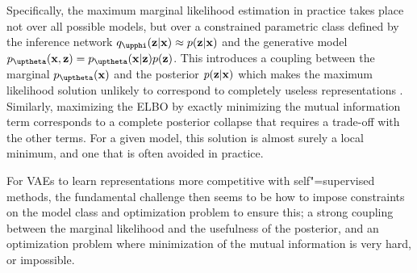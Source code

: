 Specifically, the maximum marginal likelihood estimation in practice takes place not over all possible models, but over a constrained parametric class defined by the inference network $q_\phib(\zb|\xb) \approx p(\zb|\xb)$ and the generative model $p_\thetab(\xb,\zb) = p_\thetab(\xb|\zb)p(\zb)$. 
This introduces a coupling between the marginal $p_{\thetab}(\xb)$ and the posterior $p({\mathbf{z}}|{\mathbf{x}})$ which makes the maximum likelihood solution unlikely to correspond to completely useless representations \parencite{huszar_is_2017}. 
Similarly, maximizing the ELBO %
by exactly minimizing the mutual information term corresponds to a complete posterior collapse that requires a trade-off with the other terms. For a given model, this solution is almost surely a local minimum, and one that is often avoided in practice. 

For VAEs to learn representations more competitive with self"=supervised methods, the fundamental challenge then seems to be how to impose constraints on the model class and optimization problem to ensure this; a strong coupling between the marginal likelihood and the usefulness of the posterior, and an optimization problem where minimization of the mutual information is very hard, or impossible.




